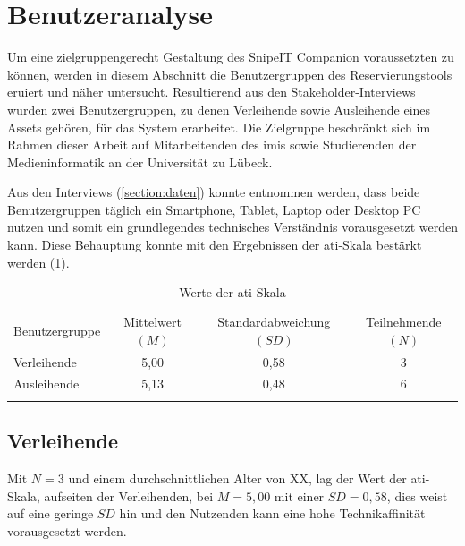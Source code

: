 \section{Benutzeranalyse}
\label{section:benutzer}
Um eine zielgruppengerecht Gestaltung des SnipeIT Companion voraussetzten zu können, werden in
diesem Abschnitt die Benutzergruppen des Reservierungstools eruiert und näher untersucht.
Resultierend aus den Stakeholder-Interviews wurden zwei Benutzergruppen, zu denen Verleihende sowie
Ausleihende eines Assets gehören, für das System erarbeitet. Die Zielgruppe beschränkt sich im
Rahmen dieser Arbeit auf Mitarbeitenden des \ac{imis} sowie  Studierenden der Medieninformatik an
der Universität zu Lübeck.

Aus den Interviews (\ref{section:daten}) konnte entnommen werden, dass beide Benutzergruppen täglich
ein Smartphone, Tablet, Laptop oder Desktop PC nutzen und somit ein grundlegendes technisches
Verständnis vorausgesetzt werden kann. Diese Behauptung konnte mit den Ergebnissen der
\ac{ati}-Skala bestärkt werden (\ref{table:ati}). 

\begin{table}[h]
        \centering
        \caption{Werte der \ac{ati}-Skala}
        \begin{tabular}{lccc}
                \arrayrulecolor{maincolor}\hline
                \sffamily\color{maincolor}Benutzergruppe & \sffamily\color{maincolor}Mittelwert
                $(M)$& \sffamily\color{maincolor}Standardabweichung $(SD)$ &
                \sffamily\color{maincolor}Teilnehmende $(N)$ \\
                \arrayrulecolor{maincolor}\hline
                Verleihende & 5,00                                 & 0,58 & 3\\
                Ausleihende & 5,13                                 & 0,48 & 6\\
                \arrayrulecolor{maincolor}\hline
        \end{tabular}
        \label{table:ati}
\end{table}

\subsection{Verleihende}
Mit $N=3$ und einem durchschnittlichen Alter von XX, lag der Wert der \ac{ati}-Skala, aufseiten der
Verleihenden, bei $M=5,00$ mit einer $SD=0,58$, dies weist auf eine geringe $SD$ hin und den
Nutzenden kann eine hohe Technikaffinität vorausgesetzt werden.

